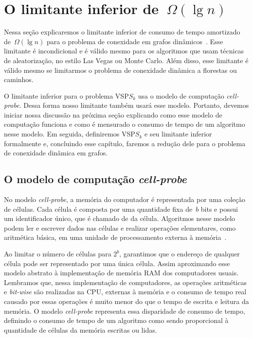 \chapter{O limitante inferior de~$\Omega(\lg n)$}
\label{sec:lim}
Nessa seção explicaremos o limitante inferior de consumo de tempo amortizado de~$\Omega(\lg n)$ para o problema de conexidade em grafos dinâmicos~\cite{lowerBoundPatrascu}. Esse limitante é incondicional e é válido mesmo para os algoritmos que usam técnicas de aleatorização, no estilo Las Vegas ou Monte Carlo. Além disso, esse limitante é válido mesmo se limitarmos o problema de conexidade dinâmica a florestas ou caminhos. 


O limitante inferior para o problema VSP$S_k$ usa o modelo de computação \textit{cell-probe}. Dessa forma nosso limitante também usará esse modelo. Portanto, devemos iniciar nossa discussão na próxima seção explicando como esse modelo de computação funciona e como é mensurado o consumo de tempo de um algoritmo nesse modelo. Em seguida, definiremos VSP$S_k$ e seu limitante inferior formalmente e, concluindo esse capítulo, faremos a redução dele para o problema de conexidade dinâmica em grafos.

\section{O modelo de computação \textit{cell-probe}}
\label{sec:lim-cell-probe}
No modelo \textit{cell-probe}, a memória do computador é representada por uma coleção de células. Cada célula é composta por uma quantidade fixa de~$b$ bits e possui um identificador único, que é chamado de  da célula. Algoritmos nesse modelo podem ler e escrever dados nas células e realizar operações elementares, como aritmética básica, em uma unidade de processamento externa à memória~\cite{Ajtai1988}.

Ao limitar o número de células para $2^b$, garantimos que o endereço de qualquer célula pode ser representado por uma única célula. Assim aproximando esse modelo abstrato à implementação de memória RAM dos computadores usuais. Lembramos que, nessa implementação de computadores, as operações aritméticas e \textit{bit-wise} são realizadas na CPU, externas à memória e o consumo de tempo real causado por essas operações é muito menor do que o tempo de escrita e leitura da memória. O modelo \textit{cell-probe} representa essa disparidade de consumo de tempo, definindo o consumo de tempo de um algoritmo como sendo proporcional à quantidade de células da memória escritas ou lidas. 

